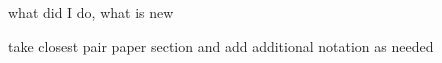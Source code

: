 \begin{isabellebody}
%
\isadelimdocument
%
\endisadelimdocument
%
\isatagdocument
%
\isamarkuptrue%
%
\endisatagdocument
{\isafolddocument}%
%
\isadelimdocument
%
\endisadelimdocument
%
\begin{isamarkuptext}%
what did I do, what is new%
\end{isamarkuptext}\isamarkuptrue%
%
\isadelimdocument
%
\endisadelimdocument
%
\isatagdocument
%
\isamarkuptrue%
%
\endisatagdocument
{\isafolddocument}%
%
\isadelimdocument
%
\endisadelimdocument
%
\begin{isamarkuptext}%
take closest pair paper section and add additional notation as needed%
\end{isamarkuptext}\isamarkuptrue%
%
\isadelimtheory
%
\endisadelimtheory
%
\isatagtheory
%
\endisatagtheory
{\isafoldtheory}%
%
\isadelimtheory
%
\endisadelimtheory
%
\end{isabellebody}%
\endinput

